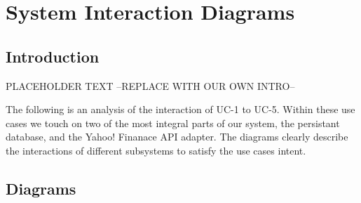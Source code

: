 \chapter{System Interaction Diagrams}


\section{Introduction}
PLACEHOLDER TEXT --REPLACE WITH OUR OWN INTRO--

The following is an analysis of the interaction of UC-1 to
UC-5.  Within these use cases we touch on two of the most
integral parts of our system, the persistant database, and
the Yahoo! Finanace API adapter. The diagrams clearly describe
the interactions of different subsystems to satisfy the use
cases intent. 

\section{Diagrams}

